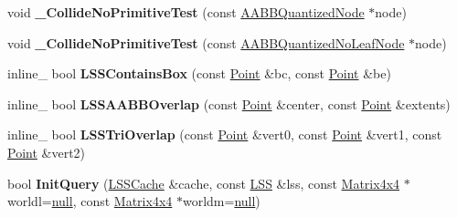 \begin{DoxyCompactItemize}
\item 
void {\bfseries \+\_\+\+Collide\+No\+Primitive\+Test} (const \hyperlink{classAABBQuantizedNode}{A\+A\+B\+B\+Quantized\+Node} $\ast$node)\hypertarget{classLSSCollider_a8bb347360fc20fe78652713c039da096}{}\label{classLSSCollider_a8bb347360fc20fe78652713c039da096}

\item 
void {\bfseries \+\_\+\+Collide\+No\+Primitive\+Test} (const \hyperlink{classAABBQuantizedNoLeafNode}{A\+A\+B\+B\+Quantized\+No\+Leaf\+Node} $\ast$node)\hypertarget{classLSSCollider_a056188eaa9ebd253545261b848c85178}{}\label{classLSSCollider_a056188eaa9ebd253545261b848c85178}

\item 
inline\+\_\+ bool {\bfseries L\+S\+S\+Contains\+Box} (const \hyperlink{classPoint}{Point} \&bc, const \hyperlink{classPoint}{Point} \&be)\hypertarget{classLSSCollider_aa94af15eb2e56b0ab8c9bfdcfb3f8a8f}{}\label{classLSSCollider_aa94af15eb2e56b0ab8c9bfdcfb3f8a8f}

\item 
inline\+\_\+ bool {\bfseries L\+S\+S\+A\+A\+B\+B\+Overlap} (const \hyperlink{classPoint}{Point} \&center, const \hyperlink{classPoint}{Point} \&extents)\hypertarget{classLSSCollider_a5d103a8f316d1475fa03e58521cbb067}{}\label{classLSSCollider_a5d103a8f316d1475fa03e58521cbb067}

\item 
inline\+\_\+ bool {\bfseries L\+S\+S\+Tri\+Overlap} (const \hyperlink{classPoint}{Point} \&vert0, const \hyperlink{classPoint}{Point} \&vert1, const \hyperlink{classPoint}{Point} \&vert2)\hypertarget{classLSSCollider_a8a3b29bd4e15f8932797a5906c152da7}{}\label{classLSSCollider_a8a3b29bd4e15f8932797a5906c152da7}

\item 
bool {\bfseries Init\+Query} (\hyperlink{structLSSCache}{L\+S\+S\+Cache} \&cache, const \hyperlink{classLSS}{L\+SS} \&lss, const \hyperlink{classMatrix4x4}{Matrix4x4} $\ast$worldl=\hyperlink{IceTypes_8h_ac97b8ee753e4405397a42ad5799b0f9e}{null}, const \hyperlink{classMatrix4x4}{Matrix4x4} $\ast$worldm=\hyperlink{IceTypes_8h_ac97b8ee753e4405397a42ad5799b0f9e}{null})\hypertarget{classLSSCollider_ae4fbd3111a8d0b680b8c6a3cfa0e4884}{}\label{classLSSCollider_ae4fbd3111a8d0b680b8c6a3cfa0e4884}

\end{DoxyCompactItemize}
